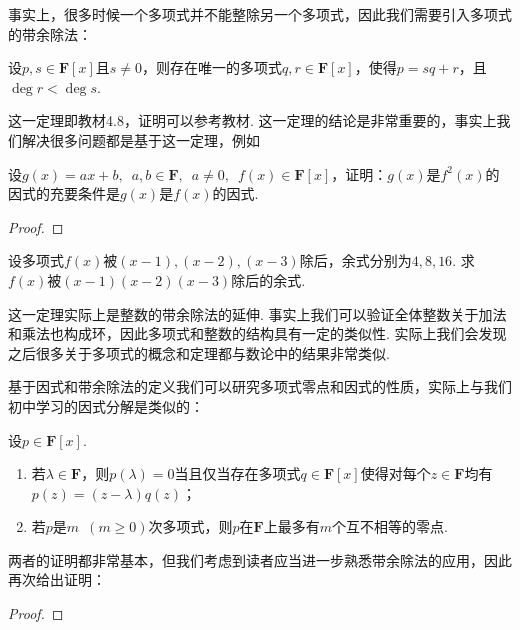 事实上，很多时候一个多项式并不能整除另一个多项式，因此我们需要引入多项式的带余除法：
\begin{theorem}
    设$p,s\in\mathbf{F}[x]$且$s\neq 0$，则存在唯一的多项式$q,r\in\mathbf{F}[x]$，使得$p=sq+r$，且$\deg r<\deg s$.
\end{theorem}

这一定理即教材4.8，证明可以参考教材. 这一定理的结论是非常重要的，事实上我们解决很多问题都是基于这一定理，例如
\begin{example}
    设$g(x)=ax+b,\enspace a,b\in\mathbf{F},\enspace a\neq 0,\enspace
        f(x)\in \mathbf{F}[x]$，证明：$g(x)$是$f^2(x)$的因式的充要条件是$g(x)$是$f(x)$的因式.
\end{example}

\begin{proof}

\end{proof}

\begin{example}
    设多项式$f(x)$被$(x-1),(x-2),(x-3)$除后，余式分别为$4,8,16$. 求$f(x)$被$(x-1)(x-2)(x-3)$除后的余式.
\end{example}

\begin{solution}

\end{solution}

这一定理实际上是整数的带余除法的延伸. 事实上我们可以验证全体整数关于加法和乘法也构成环，因此多项式和整数的结构具有一定的类似性. 实际上我们会发现之后很多关于多项式的概念和定理都与数论中的结果非常类似.

基于因式和带余除法的定义我们可以研究多项式零点和因式的性质，实际上与我们初中学习的因式分解是类似的：
\begin{theorem}
    设$p\in\mathbf{F}[x]$.
    \begin{enumerate}
        \item 若$\lambda\in\mathbf{F}$，则$p(\lambda)=0$当且仅当存在多项式$q\in\mathbf{F}[x]$使得对每个$z\in\mathbf{F}$均有$p(z)=(z-\lambda)q(z)$；

        \item 若$p$是$m\enspace(m \geqslant 0)$次多项式，则$p$在$\mathbf{F}$上最多有$m$个互不相等的零点.
    \end{enumerate}
\end{theorem}
两者的证明都非常基本，但我们考虑到读者应当进一步熟悉带余除法的应用，因此再次给出证明：

\begin{proof}

\end{proof}

